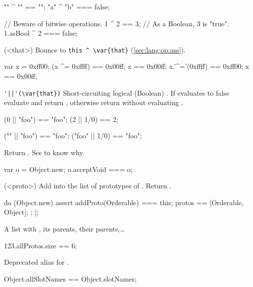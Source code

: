 \begin{urbiscriptapi}
\begin{urbiassert}
 "" ^ ""  == "";
"a" ^ "b" === false;

// Beware of bitwise operations.
1 ^ 2        == 3;     // As a Boolean, 3 is "true".
1.asBool ^ 2 === false;
\end{urbiassert}


\item['^='](<that>)%
  Bounce to \lstinline|this ^ \var{that}| (\autoref{sec:lang:op:ass}).
\begin{urbiassert}
var x = 0xff00;
(x ^= 0xffff)  == 0x00ff;  x == 0x00ff;
x.'^='(0xffff) == 0xff00;  x == 0x00ff;
\end{urbiassert}


\item \lstinline+'||'(\var{that})+%
  Short-circuiting logical (Boolean) . If \this evaluates to false
  evaluate and return , otherwise return \this without evaluating
  .
\begin{urbiassert}
(0 || "foo") == "foo";
(2 ||  1/0)  == 2;

(""    || "foo") == "foo";
("foo" || 1/0)   == "foo";
\end{urbiassert}


\item['$id']%


\item[acceptVoid]
  Return \this.  See  to know why.
\begin{urbiassert}
var o = Object.new;
o.acceptVoid === o;
\end{urbiassert}


\item[addProto](<proto>)%
  Add  into the list of prototypes of \this.  Return \this.
\begin{urbiscript}
do (Object.new)
{
  assert
  {
    addProto(Orderable) === this;
    protos == [Orderable, Object];
  };
}|;
\end{urbiscript}


\item[allProto]%
  A list with \this, its parents, their parents,\ldots
\begin{urbiassert}
123.allProtos.size == 6;
\end{urbiassert}


\item[allSlotNames]
  Deprecated alias for .
\begin{urbiassert}
Object.allSlotNames == Object.slotNames;
\end{urbiassert}



\end{urbiscriptapi}

